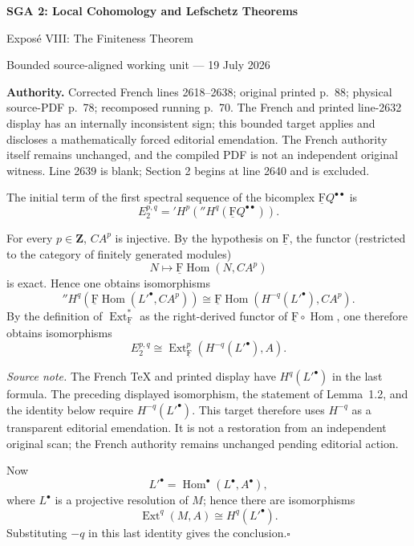 \documentclass[10pt,a4paper]{article}
\newcommand{\ZZ}{\mathbf Z}
\newcommand{\cF}{\underline{\mathrm F}}
\begin{document}
\begin{center}
  {\Large\bfseries SGA 2: Local Cohomology and Lefschetz Theorems}\par\smallskip
  {\large Expos\'e VIII: The Finiteness Theorem}\par
  \small Bounded source-aligned working unit --- 19 July 2026
\end{center}
\noindent\colorbox{softgray}{\parbox{0.95\linewidth}{\footnotesize\textbf{Authority.}
Corrected French lines 2618--2638; original printed p.~88; physical
source-PDF p.~78; recomposed running p.~70. The French and printed line-2632
display has an internally inconsistent sign; this bounded target applies and
discloses a mathematically forced editorial emendation. The French authority
itself remains unchanged, and the compiled PDF is not an independent original
witness.
Line 2639 is blank; Section 2 begins at line 2640 and is excluded.}}

The initial term of the first spectral sequence of the bicomplex
$\cF Q^{\bullet\bullet}$ is
\[
  E_2^{p,q}
  ={}'\!H^p({}''\!H^q(\cF Q^{\bullet\bullet})).
\]

For every $p\in\ZZ$, $CA^p$ is injective. By the hypothesis on $\cF$, the
functor (restricted to the category of finitely generated modules)
\[
  N\longmapsto \cF\operatorname{Hom}(N,CA^p)
\]
is exact. Hence one obtains isomorphisms
\[
  {}''\!H^q(\cF\operatorname{Hom}({L'}^\bullet,CA^p))
  \cong
  \cF\operatorname{Hom}(H^{-q}({L'}^\bullet),CA^p).
\]
By the definition of $\operatorname{Ext}^{\ast}_{\cF}$ as the right-derived functor
of $\cF\circ\operatorname{Hom}$, one therefore obtains isomorphisms
\[
  E_2^{p,q}
  \cong
  \operatorname{Ext}^{p}_{\cF}(H^{-q}({L'}^\bullet),A).
\]

\noindent\emph{Source note.} The French TeX and printed display have
$H^q({L'}^\bullet)$ in the last formula. The preceding displayed
isomorphism, the statement of Lemma~1.2, and the identity below require
$H^{-q}({L'}^\bullet)$. This target therefore uses $H^{-q}$ as a transparent
editorial emendation. It is not a restoration from an independent original
scan; the French authority remains unchanged pending editorial action.

Now
\[
  {L'}^\bullet=\operatorname{Hom}^\bullet(L^\bullet,A^\bullet),
\]
where $L^\bullet$ is a projective resolution of $M$; hence there are
isomorphisms
\[
  \operatorname{Ext}^{q}(M,A)\cong H^q({L'}^\bullet).
\]
Substituting $-q$ in this last identity gives the conclusion.\hfill$\square$
\end{document}

